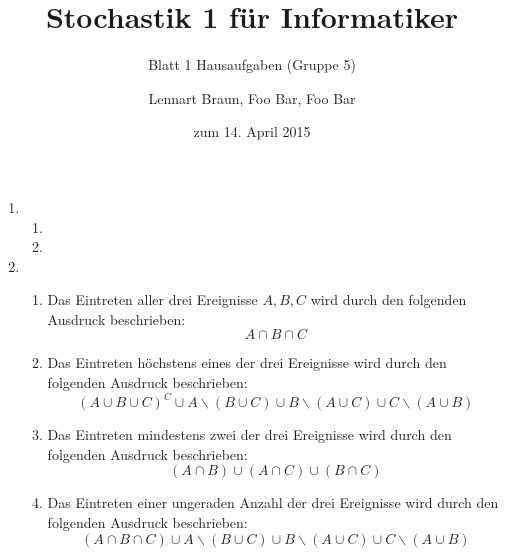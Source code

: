\documentclass[a4paper]{scrartcl}
\title{Stochastik 1 für Informatiker}
\subtitle{Blatt 1 Hausaufgaben (Gruppe 5)}
\author{
	Lennart Braun,
    Foo Bar,
    Foo Bar
}
\date{zum 14. April 2015}
\begin{document}
\maketitle

\begin{enumerate}[label=\bfseries\arabic*.]
    \item
        \begin{enumerate}[label=(\alph*)]
            \item

            \item

        \end{enumerate}

    \item
        \begin{enumerate}[label=(\alph*)]
            \item
                Das Eintreten aller drei Ereignisse $A, B, C$ wird durch
                den folgenden Ausdruck beschrieben:
                \begin{equation}
                    A \cap B \cap C
                \end{equation}

            \item
                Das Eintreten höchstens eines der drei Ereignisse wird durch
                den folgenden Ausdruck beschrieben:
                \begin{equation}
                    (A \cup B \cup C)^C
                    \cup A \backslash (B \cup C)
                    \cup B \backslash (A \cup C)
                    \cup C \backslash (A \cup B)
                \end{equation}

            \item
                Das Eintreten mindestens zwei der drei Ereignisse wird durch
                den folgenden Ausdruck beschrieben:
                \begin{equation}
                    (A \cap B) \cup (A \cap C) \cup (B \cap C)
                \end{equation}

            \item
                Das Eintreten einer ungeraden Anzahl der drei Ereignisse wird
                durch den folgenden Ausdruck beschrieben:
                \begin{equation}
                    (A \cap B \cap C)
                    \cup A \backslash (B \cup C)
                    \cup B \backslash (A \cup C)
                    \cup C \backslash (A \cup B)
                \end{equation}


\end{enumerate}
\end{enumerate}
\end{document}
